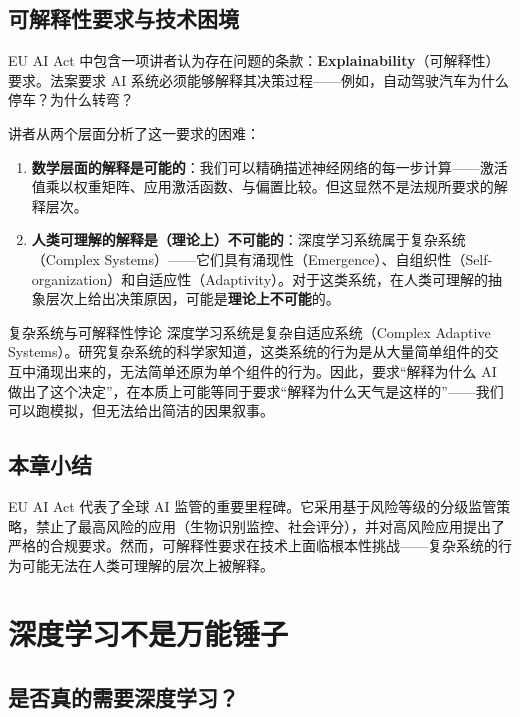 \documentclass[a4paper]{article}
\begin{document}
\subsection{可解释性要求与技术困境}

EU AI Act 中包含一项讲者认为存在问题的条款：\textbf{Explainability}（可解释性）要求。法案要求 AI 系统必须能够解释其决策过程——例如，自动驾驶汽车为什么停车？为什么转弯？

讲者从两个层面分析了这一要求的困难：

\begin{enumerate}
    \item \textbf{数学层面的解释是可能的}：我们可以精确描述神经网络的每一步计算——激活值乘以权重矩阵、应用激活函数、与偏置比较。但这显然不是法规所要求的解释层次。
    \item \textbf{人类可理解的解释是（理论上）不可能的}：深度学习系统属于复杂系统（Complex Systems）——它们具有涌现性（Emergence）、自组织性（Self-organization）和自适应性（Adaptivity）。对于这类系统，在人类可理解的抽象层次上给出决策原因，可能是\textbf{理论上不可能}的。
\end{enumerate}

\begin{importantbox}{复杂系统与可解释性悖论}
深度学习系统是复杂自适应系统（Complex Adaptive Systems）。研究复杂系统的科学家知道，这类系统的行为是从大量简单组件的交互中涌现出来的，无法简单还原为单个组件的行为。因此，要求``解释为什么 AI 做出了这个决定''，在本质上可能等同于要求``解释为什么天气是这样的''——我们可以跑模拟，但无法给出简洁的因果叙事。
\end{importantbox}

\subsection{本章小结}

EU AI Act 代表了全球 AI 监管的重要里程碑。它采用基于风险等级的分级监管策略，禁止了最高风险的应用（生物识别监控、社会评分），并对高风险应用提出了严格的合规要求。然而，可解释性要求在技术上面临根本性挑战——复杂系统的行为可能无法在人类可理解的层次上被解释。

\section{深度学习不是万能锤子}

\subsection{是否真的需要深度学习？}
\end{document}
